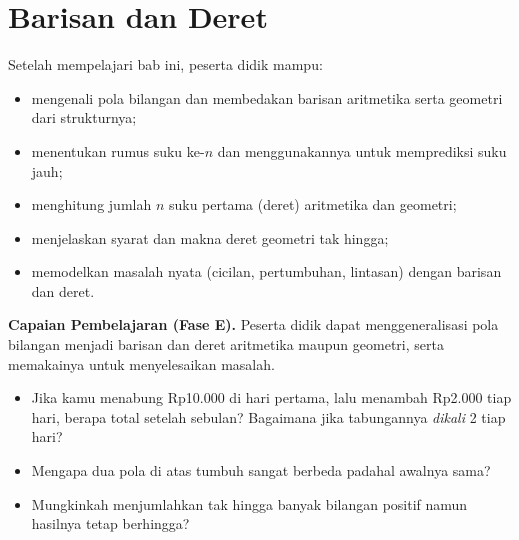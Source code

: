 \documentclass[11pt,a4paper]{report}
\theoremstyle{gaya}
\begin{document}
\chapter{Barisan dan Deret}
\begin{tujuan}
Setelah mempelajari bab ini, peserta didik mampu:
\begin{itemize}[leftmargin=*,topsep=2pt]
  \item mengenali pola bilangan dan membedakan barisan aritmetika serta geometri dari strukturnya;
  \item menentukan rumus suku ke-$n$ dan menggunakannya untuk memprediksi suku jauh;
  \item menghitung jumlah $n$ suku pertama (deret) aritmetika dan geometri;
  \item menjelaskan syarat dan makna deret geometri tak hingga;
  \item memodelkan masalah nyata (cicilan, pertumbuhan, lintasan) dengan barisan dan deret.
\end{itemize}
\textbf{Capaian Pembelajaran (Fase E).} Peserta didik dapat menggeneralisasi pola bilangan menjadi barisan dan deret aritmetika maupun geometri, serta memakainya untuk menyelesaikan masalah.
\end{tujuan}

\begin{pemantik}
\begin{itemize}[leftmargin=*,topsep=2pt]
  \item Jika kamu menabung Rp10.000 di hari pertama, lalu menambah Rp2.000 tiap hari, berapa total setelah sebulan? Bagaimana jika tabungannya \emph{dikali} 2 tiap hari?
  \item Mengapa dua pola di atas tumbuh sangat berbeda padahal awalnya sama?
  \item Mungkinkah menjumlahkan tak hingga banyak bilangan positif namun hasilnya tetap berhingga?
\end{itemize}
\end{pemantik}
\end{document}
